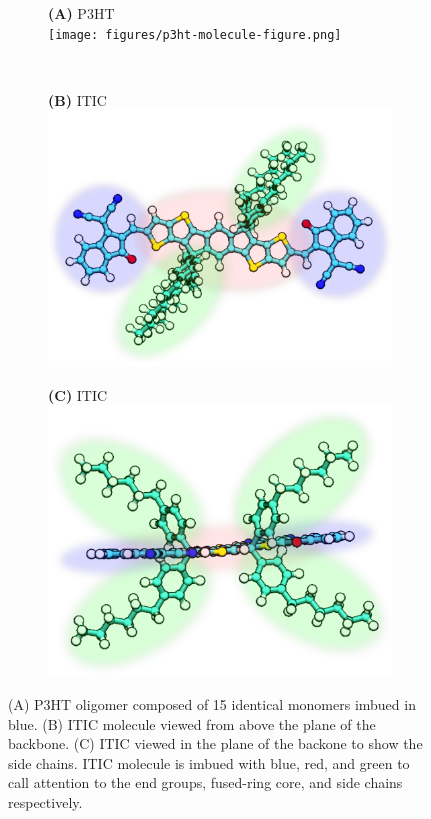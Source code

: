 \begin{figure}[]
\centering
\begin{subfigure}{\textwidth}
    \centering
    \textbf{(A)} P3HT \\
    \texttt{[image: figures/p3ht-molecule-figure.png]}
    \newline
\end{subfigure}%
\\
\begin{subfigure}{.5\textwidth}
    \textbf{(B)} ITIC
    \centering
    \includegraphics[width=\textwidth]{figures/itic-backbone-figure.png}
\end{subfigure}%
\begin{subfigure}{.5\textwidth}
    \textbf{(C)} ITIC
    \centering
    \includegraphics[width=\textwidth]{figures/itic-sidechain-figure.png}
\end{subfigure}
    \caption[short]{(A) P3HT oligomer composed of 15 identical monomers imbued in blue.
    (B) ITIC molecule viewed from above the plane of the backbone. 
    (C) ITIC viewed in the plane of the backone to show the side chains. ITIC
    molecule is imbued with blue, red, and green to call attention to the end groups, fused-ring core, and
    side chains respectively.}
\label{molecules}
\end{figure}

